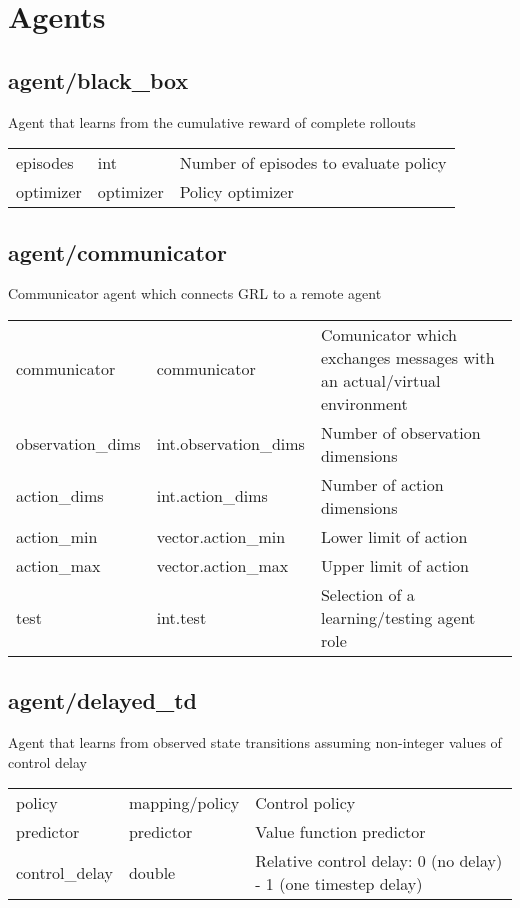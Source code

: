\section{Agents}
\subsection{agent/black\_box}
\noindent Agent that learns from the cumulative reward of complete rollouts\\

\noindent\begin{tabular}{@{}lll@{}}
episodes&int&Number of episodes to evaluate policy\\
optimizer&optimizer&Policy optimizer\\
\end{tabular}
\subsection{agent/communicator}
\noindent Communicator agent which connects GRL to a remote agent\\

\noindent\begin{tabular}{@{}lll@{}}
communicator&communicator&Comunicator which exchanges messages with an actual/virtual environment\\
observation\_dims&int.observation\_dims&Number of observation dimensions\\
action\_dims&int.action\_dims&Number of action dimensions\\
action\_min&vector.action\_min&Lower limit of action\\
action\_max&vector.action\_max&Upper limit of action\\
test&int.test&Selection of a learning/testing agent role\\
\end{tabular}
\subsection{agent/delayed\_td}
\noindent Agent that learns from observed state transitions assuming non-integer values of control delay\\

\noindent\begin{tabular}{@{}lll@{}}
policy&mapping/policy&Control policy\\
predictor&predictor&Value function predictor\\
control\_delay&double&Relative control delay: 0 (no delay) - 1 (one timestep delay) \\
\end{tabular}
